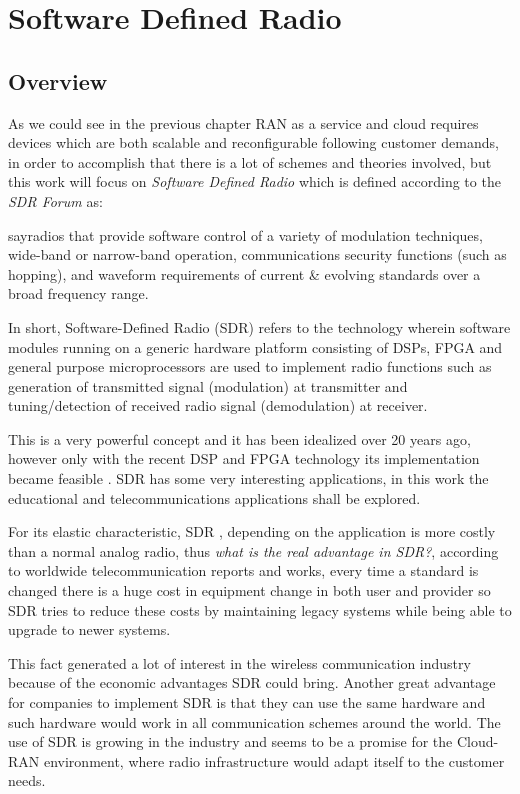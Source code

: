 \chapter{Software Defined Radio}

\section{Overview}
\label{sdr:overview}

As we could see in the previous chapter RAN as a service and cloud requires
devices which are both scalable and reconfigurable following customer demands,
in order to accomplish that there is a lot of schemes and theories involved,
but this work will focus on \emph{Software Defined Radio} which is defined
according to the \emph{SDR Forum} \cite{web:sdrforum} as:

say{radios that provide software control of a variety of modulation techniques,
wide-band or narrow-band operation, communications security functions
(such as hopping), and waveform requirements of current \& evolving standards
over a broad frequency range.}

In short, Software-Defined Radio (SDR) refers to the technology wherein software
 modules running on a generic hardware platform consisting of DSPs, FPGA and
 general purpose microprocessors are used to implement radio functions such as
 generation of transmitted signal (modulation) at transmitter and tuning/detection
 of received radio signal (demodulation) at receiver.


This is a very powerful concept and it has been idealized over 20 years ago,
however only with the recent DSP and FPGA technology its implementation became
feasible \cite{ladimer2009}. SDR has some very interesting applications, in this
work the educational and telecommunications applications shall be explored.

For its elastic characteristic, SDR , depending on the application is more
costly than a normal analog radio, thus \emph{what is the real advantage in SDR?},
according to worldwide telecommunication reports and works, every time a standard
is changed there is a huge cost in equipment change in both user and provider so
SDR tries to reduce these costs by maintaining legacy systems while being able
to upgrade to newer systems\cite{dayananda2012}.

This fact generated a lot of interest in the wireless communication industry
because of the economic advantages SDR could bring. Another great advantage
for companies to implement SDR is that they can use the same hardware and such
hardware would work in all communication schemes around the world. The use of
SDR is growing in the industry and seems to be a promise for the Cloud-RAN
environment, where radio infrastructure would adapt itself to the customer needs.


